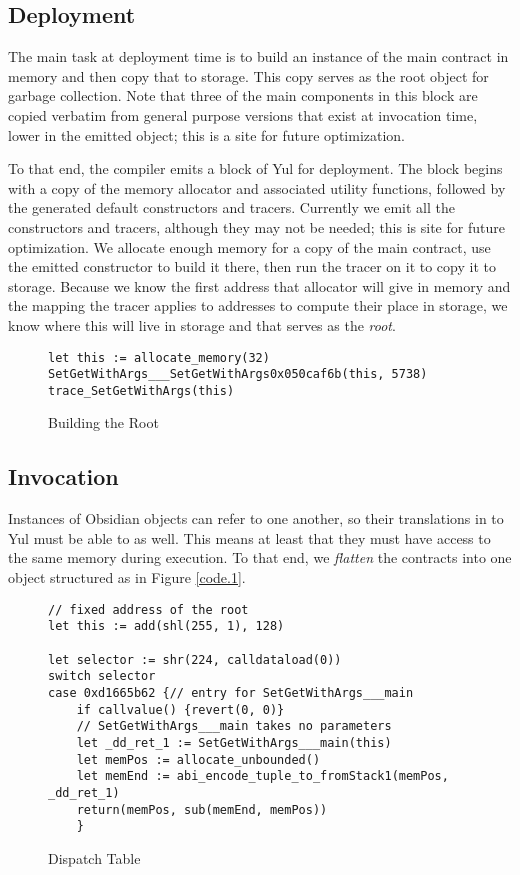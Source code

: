 \subsection{Deployment}

The main task at deployment time is to build an instance of the main
contract in memory and then copy that to storage. This copy serves as the
root object for garbage collection. Note that three of the main components
in this block are copied verbatim from general purpose versions that exist
at invocation time, lower in the emitted object; this is a site for future
optimization.

To that end, the compiler emits a block of Yul for deployment. The block begins with a copy of the memory
allocator and associated utility functions, followed by the generated
default constructors and tracers. Currently we emit all the constructors
and tracers, although they may not be needed; this is site for future
optimization. We allocate enough memory for a copy of the main contract,
use the emitted constructor to build it there, then run the tracer on it to
copy it to storage. Because we know the first address that allocator will
give in memory and the mapping the tracer applies to addresses to compute
their place in storage, we know where this will live in storage and that
serves as the \emph{root}.

\begin{figure}[hbtp]
    \caption{Building the Root}
    \label{code.6}
    \begin{lstlisting}[language=yul,frame=single]
let this := allocate_memory(32)
SetGetWithArgs___SetGetWithArgs0x050caf6b(this, 5738)
trace_SetGetWithArgs(this)
    \end{lstlisting}
\end{figure}

\subsection{Invocation}

Instances of Obsidian objects can refer to one another, so their
translations in to Yul must be able to as well. This means at least that
they must have access to the same memory during execution. To that end, we
\emph{flatten} the contracts into one object structured as in Figure
\ref{code.1}.

\begin{figure}[hbtp]
    \caption{Dispatch Table}
    \label{code.7}
    \begin{lstlisting}[language=yul,frame=single]
// fixed address of the root
let this := add(shl(255, 1), 128)

let selector := shr(224, calldataload(0))
switch selector
case 0xd1665b62 {// entry for SetGetWithArgs___main
    if callvalue() {revert(0, 0)}
    // SetGetWithArgs___main takes no parameters
    let _dd_ret_1 := SetGetWithArgs___main(this)
    let memPos := allocate_unbounded()
    let memEnd := abi_encode_tuple_to_fromStack1(memPos, _dd_ret_1)
    return(memPos, sub(memEnd, memPos))
    }
    \end{lstlisting}
\end{figure}

